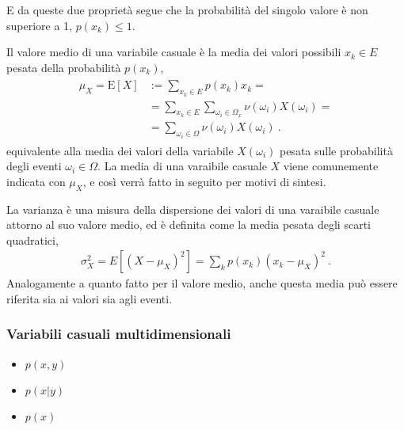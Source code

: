 \documentclass[letterpaper,10pt,italian]{jupyterBook}
\begin{document}
\sphinxAtStartPar
E da queste due proprietà segue che la probabilità del singolo valore è non superiore a 1, \(p(x_k) \le 1\).

\sphinxAtStartPar
{} Il valore medio di una variabile casuale è la media dei valori possibili \(x_k \in E\) pesata della probabilità \(p(x_k)\),
\begin{equation*}
\begin{split}\begin{aligned}
 \mu_X = \text{E}[X] 
  & := \sum_{x_k \in E} p(x_k) x_k = \\
  & = \sum_{x_k \in E} \sum_{\omega_i \in \Omega_x} \nu(\omega_i) X(\omega_i) = \\
  & = \sum_{\omega_i \in \Omega} \nu(\omega_i) X(\omega_i) \ .
\end{aligned}\end{split}
\end{equation*}
\sphinxAtStartPar
equivalente alla media dei valori della variabile \(X(\omega_i)\) pesata sulle probabilità degli eventi \(\omega_i \in \Omega\). La media di una varaibile casuale \(X\) viene comunemente indicata con \(\mu_X\), e così verrà fatto in seguito per motivi di sintesi.

\sphinxAtStartPar
{} La varianza è una misura della dispersione dei valori di una varaibile casuale attorno al suo valore medio, ed è definita come la media pesata degli scarti quadratici,
\begin{equation*}
\begin{split}\sigma^2_X = E[(X-\mu_X)^2] = \sum_k p(x_k) (x_k - \mu_X)^2 \ .\end{split}
\end{equation*}
\sphinxAtStartPar
Analogamente a quanto fatto per il valore medio, anche questa media può essere riferita sia ai valori sia agli eventi.




\subsubsection{Variabili casuali multi\sphinxhyphen{}dimensionali}
\label{\detokenize{ch/statistics/random_variables_discrete:variabili-casuali-multi-dimensionali}}\begin{itemize}
\item {} 
\sphinxAtStartPar
{} \(p(x,y)\)

\item {} 
\sphinxAtStartPar
{} \(p(x|y)\)

\item {} 
\sphinxAtStartPar
{} \(p(x)\)

\end{itemize}
\end{document}
